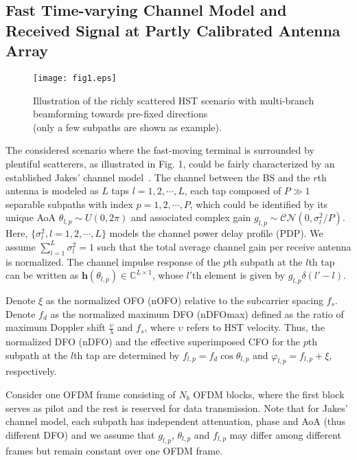 \documentclass[12pt, draftclsnofoot, onecolumn]{IEEEtran}
\begin{document}
\vspace{-0.9em}
\subsection{Fast Time-varying Channel Model and Received Signal at Partly Calibrated Antenna Array}
\begin{figure}[t]
\setlength{\abovecaptionskip}{-0.5cm}
\setlength{\belowcaptionskip}{-1.0cm}
\begin{center}
\texttt{[image: fig1.eps]}
\end{center}
\caption{ Illustration of the richly scattered HST scenario with multi-branch beamforming towards pre-fixed directions \\ (only a few subpaths are shown as example). }
\end{figure}

The considered scenario where the fast-moving terminal is surrounded by plentiful scatterers, as illustrated in Fig. 1, could be fairly characterized by an established Jakes' channel model~\cite{bWC_Jakes1994, YR_Zheng2003TC}. The channel between the BS and the $r$th antenna is modeled as $L$ taps $l\!=\!1,2,\cdots\!,L $, each tap composed of $P \!\gg\! 1$ separable subpaths with index $p\!=\!1,2,\cdots\!,P $, which could be identified by its unique AoA $\theta_{l,p} \sim U\left(0,2\pi \right)$ and associated complex gain $g_{l,p} \sim \mathcal{CN}\left( 0, {\sigma_{l}^{2}}/P \right)$. Here, $\{\sigma_{l}^{2}, l\!=\!1,2,\cdots\!, L\}$ models the channel power delay profile (PDP). We assume $\sum\nolimits_{l=1}^{L}{\sigma_{l}^{2}} = 1$ such that the total average channel gain per receive antenna is normalized. The channel impulse response of the $p$th subpath at the $l$th tap can be written as $\mathbf{h}\left( {{\theta }_{l,p}} \right)\in {{\mathbb{C}}^{L\times 1}}$, whose $l'$th element is given by ${{g}_{l, p}}\delta \left( l'-{l} \right)$.

Denote $\xi$ as the normalized OFO (nOFO) relative to the subcarrier spacing ${{f}_{s}}$. Denote $f_d$ as the normalized maximum DFO (nDFOmax) defined as the ratio of maximum Doppler shift $\frac{\upsilon }{\lambda }$ and ${{f}_{s}}$, where $\upsilon$ refers to HST velocity. Thus, the normalized DFO (nDFO) and the effective superimposed CFO for the $p$th subpath at the $l$th tap are determined by ${{f}_{l, p}}={{f}_{d}}\cos {{\theta }_{l, p}}$ and ${{\varphi }_{l,p}}={{f}_{l,p}}+\xi $, respectively.


Consider one OFDM frame consisting of $N_b$ OFDM blocks, where the first block serves as pilot and the rest is reserved for data transmission. Note that for Jakes' channel model, each subpath has independent attenuation, phase and AoA (thus different DFO) and we assume that $g_{l,p}$, $\theta_{l,p}$ and $f_{l,p}$ may differ among different frames but remain constant over one OFDM frame.
\end{document}
